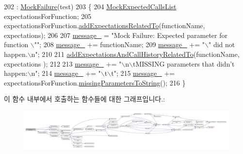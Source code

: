 \begin{DoxyCode}
202                                                                                                            
                                                                         : \hyperlink{class_mock_failure_aa65f1551bfe7e7b896e059a164d69c6b}{MockFailure}(test)
203 \{
204     \hyperlink{class_mock_expected_calls_list}{MockExpectedCallsList} expectationsForFunction;
205     expectationsForFunction.\hyperlink{class_mock_expected_calls_list_a462f63288f7f9ae4b33d0b5d0eca265e}{addExpectationsRelatedTo}(functionName, expectations);
206 
207     \hyperlink{class_test_failure_af95aeab689fdb637c3e94b0c10db3e53}{message\_} = \textcolor{stringliteral}{"Mock Failure: Expected parameter for function \(\backslash\)""};
208     \hyperlink{class_test_failure_af95aeab689fdb637c3e94b0c10db3e53}{message\_} += functionName;
209     \hyperlink{class_test_failure_af95aeab689fdb637c3e94b0c10db3e53}{message\_} += \textcolor{stringliteral}{"\(\backslash\)" did not happen.\(\backslash\)n"};
210 
211     \hyperlink{class_mock_failure_a24651d311fc939aed3e710afee30edbf}{addExpectationsAndCallHistoryRelatedTo}(functionName, expectations
      );
212 
213     \hyperlink{class_test_failure_af95aeab689fdb637c3e94b0c10db3e53}{message\_} += \textcolor{stringliteral}{"\(\backslash\)n\(\backslash\)tMISSING parameters that didn't happen:\(\backslash\)n"};
214     \hyperlink{class_test_failure_af95aeab689fdb637c3e94b0c10db3e53}{message\_} += \textcolor{stringliteral}{"\(\backslash\)t\(\backslash\)t"};
215     \hyperlink{class_test_failure_af95aeab689fdb637c3e94b0c10db3e53}{message\_} += expectationsForFunction.\hyperlink{class_mock_expected_calls_list_a191036eb1f8823286092ad3519820b38}{missingParametersToString}();
216 \}
\end{DoxyCode}


이 함수 내부에서 호출하는 함수들에 대한 그래프입니다.\+:
\nopagebreak
\begin{figure}[H]
\begin{center}
\leavevmode
\includegraphics[width=350pt]{class_mock_expected_parameter_didnt_happen_failure_ab9eda002a01c124f147d29b7b0dea827_cgraph}
\end{center}
\end{figure}




